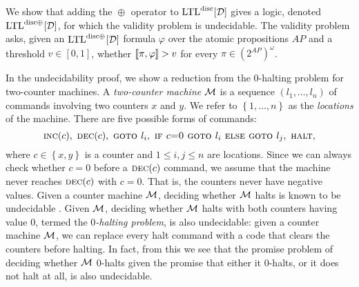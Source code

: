 \documentclass{llncs}
\newcommand{\set}[1]{{\left\{#1\right\}}}
\newcommand{\LTL}{{\ensuremath{\rm LTL}}\xspace}
\newcommand{\D}{{\cal D}}
\newcommand{\M}{{\cal M}}
\newcommand{\avg}[1]{\oplus_{#1}}
\newcommand{\DLTL}{\ensuremath{\LTL^{\text{disc}}[\D]}}
\newcommand{\AvDLTL}{\ensuremath{\LTL^{\text{disc$\avg{}$}}[\D]}}
\begin{document}
\newcommand{\inc}{\mbox{\sc inc}\xspace}
\newcommand{\dec}{\mbox{\sc dec}\xspace}
\newcommand{\goto}{\mbox{\sc goto }}
\newcommand{\halt}{\mbox{\sc halt}\xspace}
\newcommand{\jz}[3]{\mbox{\sc if $#1$=0 goto $#2$ else goto $#3$}\xspace}
\newcommand{\CMrun}{\rho}
\newcommand{\comcheck}{\mbox{\rm ComCheck}\xspace}

We show that adding the $\avg{}$ operator to $\DLTL$ gives a logic, denoted $\AvDLTL$, for which the validity problem is undecidable.
The validity problem asks, given an $\AvDLTL$ formula $\varphi$ over the atomic propositions $AP$ and a threshold $v\in[0,1]$, whether $[\![\pi,\varphi]\!]>v$ for every $\pi\in ({2^{AP}})^\omega$.

In the undecidability proof, we show a reduction from the 0-halting problem for two-counter machines.
A {\em two-counter machine} $\M$ is a sequence $(l_1,\ldots,l_n)$ of commands involving two counters $x$ and $y$. We refer to
$\set{1,\ldots,n}$ as the {\em locations} of the machine. There are five possible forms of commands:
$$\inc(c),\ \dec(c),\ \goto l_i,\  \jz{c}{l_i}{l_j},\  \halt,$$
where $c\in \set{x,y}$ is a counter and $1\le i,j\le n$ are locations. Since we can always check whether $c=0$ before a $\dec(c)$ command, we
assume that the machine never reaches $\dec(c)$ with $c=0$. That is, the counters never have negative values. Given a counter machine $\M$,
deciding whether $\M$ halts is known to be undecidable \cite{Min67}. Given $\M$, deciding whether $\M$ halts with both counters having value
$0$, termed the {\em $0$-halting problem}, is also undecidable: given a counter machine $\M$, we can replace every \halt command with a code that clears the counters before
halting. 
In fact, from this we see that the promise problem of deciding whether $\M$ $0$-halts given the promise that either it $0$-halts, or it does not halt at all, is also undecidable.
\end{document}
